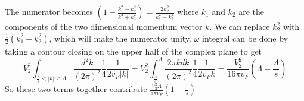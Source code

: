 \documentclass[a4paper,crop=false]{standalone}
\begin{document}
\begin{itemize}
\begin{itemize}
\begin{equation}
                        \end{equation}
                        The numerator becomes $\left(1-\frac{k^2_1-k^2_2}{k^2_1+k^2_2}\right) = \frac{2k^2_2}{k^2_1 + k^2_2}$ where $k_1$ and $k_2$ are the components of the two dimensional momentum vector $k$. We can replace $k^2_2$ with $\frac{1}{2}(k^2_1 + k^2_2)$, which will make the numerator unity. $\omega$ integral can be done by taking a contour closing on the upper half of the complex plane to get
                        \begin{equation}
                            V^2_2\int_{\frac{\Lambda}{s}<|k|<\Lambda}\frac{d^2k}{(2\pi)^2}\frac{1}{4}\frac{1}{2v_F|k|} = V^2_2 \int^{\Lambda}_{\frac{\Lambda}{s}} \frac{2\pi kdk}{(2\pi)^2}\frac{1}{4}\frac{1}{2v_Fk} = \frac{V^2_2}{16\pi v_F}\left( \Lambda-\frac{\Lambda}{s} \right)
                        \end{equation}
                        So these two terms together contribute $\frac{V^2_2\Lambda}{8\pi v_F}\left(1-\frac{1}{s}\right)$
                \end{itemize}
        \end{itemize}
\end{document}
